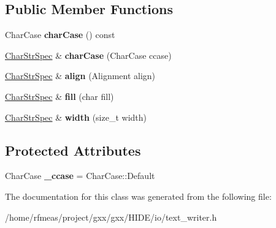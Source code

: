 \subsection*{Public Member Functions}
\begin{DoxyCompactItemize}
\item 
Char\+Case {\bfseries char\+Case} () const \hypertarget{classgxx_1_1CharStrSpec_a1dc341eb44cbe131c1359d8250db5b22}{}\label{classgxx_1_1CharStrSpec_a1dc341eb44cbe131c1359d8250db5b22}

\item 
\hyperlink{classgxx_1_1CharStrSpec}{Char\+Str\+Spec} \& {\bfseries char\+Case} (Char\+Case ccase)\hypertarget{classgxx_1_1CharStrSpec_a20049f3f82f482bb85160a6d1158714d}{}\label{classgxx_1_1CharStrSpec_a20049f3f82f482bb85160a6d1158714d}

\item 
\hyperlink{classgxx_1_1CharStrSpec}{Char\+Str\+Spec} \& {\bfseries align} (Alignment align)\hypertarget{classgxx_1_1CharStrSpec_a99e021803ace781163acad2b6bd9efd5}{}\label{classgxx_1_1CharStrSpec_a99e021803ace781163acad2b6bd9efd5}

\item 
\hyperlink{classgxx_1_1CharStrSpec}{Char\+Str\+Spec} \& {\bfseries fill} (char fill)\hypertarget{classgxx_1_1CharStrSpec_af6ded10729691615ca0f869af442e1d4}{}\label{classgxx_1_1CharStrSpec_af6ded10729691615ca0f869af442e1d4}

\item 
\hyperlink{classgxx_1_1CharStrSpec}{Char\+Str\+Spec} \& {\bfseries width} (size\+\_\+t width)\hypertarget{classgxx_1_1CharStrSpec_ab53ac51ccdba3528c7d7ac1872974011}{}\label{classgxx_1_1CharStrSpec_ab53ac51ccdba3528c7d7ac1872974011}

\end{DoxyCompactItemize}
\subsection*{Protected Attributes}
\begin{DoxyCompactItemize}
\item 
Char\+Case {\bfseries \+\_\+ccase} = Char\+Case\+::\+Default\hypertarget{classgxx_1_1CharStrSpec_a1dc900c599fa48930a12eade5984c182}{}\label{classgxx_1_1CharStrSpec_a1dc900c599fa48930a12eade5984c182}

\end{DoxyCompactItemize}


The documentation for this class was generated from the following file\+:\begin{DoxyCompactItemize}
\item 
/home/rfmeas/project/gxx/gxx/\+H\+I\+D\+E/io/text\+\_\+writer.\+h\end{DoxyCompactItemize}
